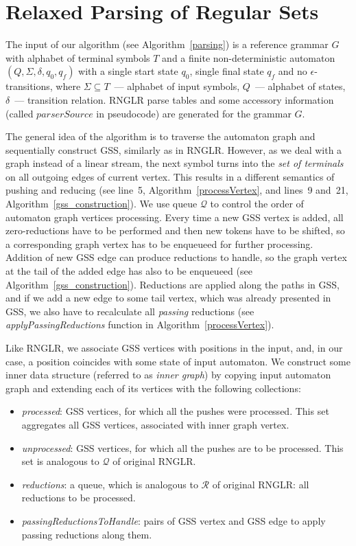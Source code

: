 \section{Relaxed Parsing of Regular Sets}

The input of our algorithm (see Algorithm~\ref{parsing}) is a reference grammar $G$ with alphabet of terminal symbols $T$ 
and a finite non-deterministic automaton $(Q, \Sigma, \delta, q_0, q_f)$ with a single start state $q_0$, single final state $q_f$ 
and no $\epsilon$-transitions, where $\Sigma \subseteq T$~--- alphabet of input symbols, $Q$~--- alphabet of states, 
$\delta$~--- transition relation. RNGLR parse tables and some accessory information (called $parserSource$ in pseudocode) 
are generated for the grammar $G$. 

The general idea of the algorithm is to traverse the automaton graph and sequentially construct GSS, similarly as in RNGLR.
However, as we deal with a graph instead of a linear stream, the next symbol turns into the \emph{set of terminals} on 
all outgoing edges of current vertex. This results in a different semantics of pushing and reducing (see line~5, 
Algorithm~\ref{processVertex}, and lines~9 and~21, Algorithm~\ref{gss_construction}). We use queue $\mathcal Q$ to control the 
order of automaton graph vertices processing. Every time a new GSS vertex is added, all zero-reductions have to be performed 
and then new tokens have to be shifted, so a corresponding graph vertex has to be enqueueed for further processing. 
Addition of new GSS edge can produce reductions to handle, so the graph vertex at the tail of the added edge has 
also to be enqueueed (see Algorithm~\ref{gss_construction}). Reductions are applied along the paths in GSS, and if we add
a new edge to some tail vertex, which was already presented in GSS, we also have to recalculate all \emph{passing} reductions
(see \emph{applyPassingReductions} function in Algorithm~\ref{processVertex}).

Like RNGLR, we associate GSS vertices with positions in the input,
and, in our case, a position coincides with some state of input automaton. We construct some
inner data structure (referred to as \emph{inner graph}) by copying input automaton graph and 
extending each of its vertices with the following collections: 

\begin{itemize}
  \item \emph{processed}: GSS vertices, for which all the pushes were processed. 
   This set aggregates all GSS vertices, associated with inner graph vertex.
  \item \emph{unprocessed}: GSS vertices, for which all the pushes are to be processed. 
   This set is analogous to $\mathcal{Q}$ of original RNGLR.
  \item \emph{reductions}: a queue, which is analogous to $\mathcal{R}$ of original RNGLR: 
   all reductions to be processed.
  \item \emph{passingReductionsToHandle}: pairs of GSS vertex and GSS edge to apply 
   passing reductions along them.
\end{itemize}

